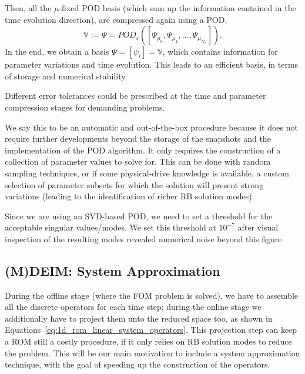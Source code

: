 \documentclass[../../thesis.tex]{subfiles}
\newcommand{\rbV}{\ensuremath{\mathbb{V}}}
\begin{document}
Then, all the $\mu$-fixed POD basis 
(which sum up the information contained in the time evolution direction), 
are compressed again using a POD,
\begin{equation*}
    \rbV := \Psi = POD_{\varepsilon} \left(\left[\Psi_{\mu_0}, \Psi_{\mu_1}, \ldots, \Psi_{\mu_{N_{\mu}}}\right]\right).
\end{equation*}
In the end, we obtain a basis $\Psi = [\psi_i] = \rbV$, 
which contains information for parameter variations and time evolution.
This leads to an efficient basis, in terms of storage and numerical stability

Different error tolerances could be prescribed at the time and parameter compression stages
for demanding problems.

We say this to be an automatic and out-of-the-box procedure because it does not require further developments 
beyond the storage of the snapshots and the implementation of the POD algorithm.
It only requires the construction of a collection of parameter values to solve for.
This can be done with random sampling techniques, 
or if some physical-drive knowledge is available, 
a custom selection of parameter subsets for which the solution will present strong variations 
(leading to the identification of richer RB solution modes).

Since we are using an SVD-based POD, we need to set a threshold for
the acceptable singular values/modes.
We set this threshold at $10^{-7}$
after visual inspection of the resulting modes revealed
numerical noise beyond this figure.


\subsection{(M)DEIM: System Approximation}
\label{sec:1d_rom_burgers_system_approximation_deim}
During the offline stage (where the FOM problem is solved), 
we have to assemble all the discrete operators for each time step;
during the online stage we additionally have to project them unto the reduced space too, as shown in Equations~\eqref{eq:1d_rom_linear_system_operators}.
This projection step can keep a ROM still a costly procedure,
if it only relies on RB solution modes to reduce the problem.
This will be our main motivation to include a system approximation technique,
with the goal of speeding up the construction of the operators.
\end{document}
